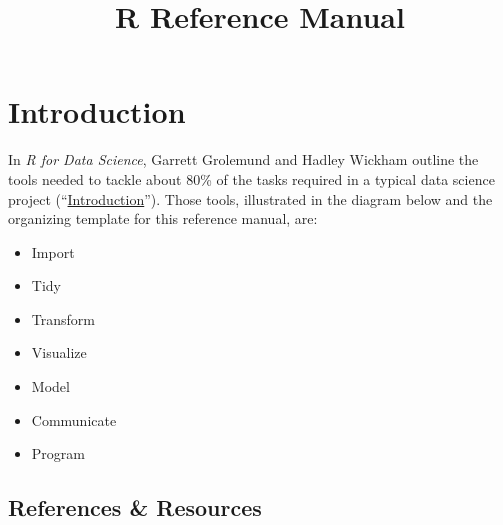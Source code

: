 \documentclass[
]{book}
\title{R Reference Manual}
\author{}
\date{\vspace{-2.5em}}
\providecommand{\tightlist}{%
  \setlength{\itemsep}{0pt}\setlength{\parskip}{0pt}}
\begin{document}
\maketitle

{
\setcounter{tocdepth}{1}
\tableofcontents
}
\hypertarget{introduction}{%
\chapter{Introduction}\label{introduction}}

In \emph{R for Data Science}, Garrett Grolemund and Hadley Wickham outline the tools needed to tackle about 80\% of the tasks required in a typical data science project (``\href{https://r4ds.had.co.nz/introduction.html}{Introduction}''). Those tools, illustrated in the diagram below and the organizing template for this reference manual, are:

\begin{itemize}
\tightlist
\item
  Import
\item
  Tidy
\item
  Transform
\item
  Visualize
\item
  Model
\item
  Communicate
\item
  Program
\end{itemize}

\hypertarget{references-resources}{%
\section{References \& Resources}\label{references-resources}}
\end{document}
